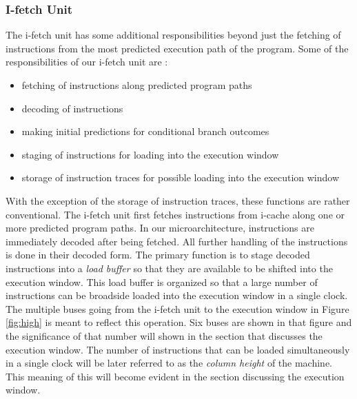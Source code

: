 %
\subsubsection{I-fetch Unit}
%
The i-fetch unit has some additional responsibilities beyond just
the fetching of instructions from the most predicted execution path
of the program.  
Some of the responsibilities of our i-fetch unit are :
%
\begin{itemize}
\item{fetching of instructions along predicted program paths}
\item{decoding of instructions}
\item{making initial predictions for conditional branch outcomes}
\item{staging of instructions for loading into the execution window}
\item{storage of instruction traces for possible loading into the
execution window}
\end{itemize}   
%
With the exception of the storage of instruction traces,
these functions are rather conventional.
The i-fetch unit first fetches instructions from i-cache
along one or more predicted program paths.
In our microarchitecture, instructions are immediately
decoded after being fetched.
All further handling of the instructions is done in their decoded
form.
The primary function is to stage decoded instructions 
into a \textit{load buffer}
so that they are available to be shifted into the execution
window.  This load buffer is organized so that
a large number of instructions can be broadside loaded into the
execution window in a single clock.
The multiple buses going from the i-fetch unit to the
execution window in Figure \ref{fig:high} is meant to
reflect this operation.  Six buses are shown in that figure
and the significance of that number will shown in the
section that discusses the execution window.
The number of instructions that can be loaded simultaneously
in a single clock will be later referred to as 
the \textit{column height} of the machine.  This meaning
of this will become
evident in the section discussing the execution window.

